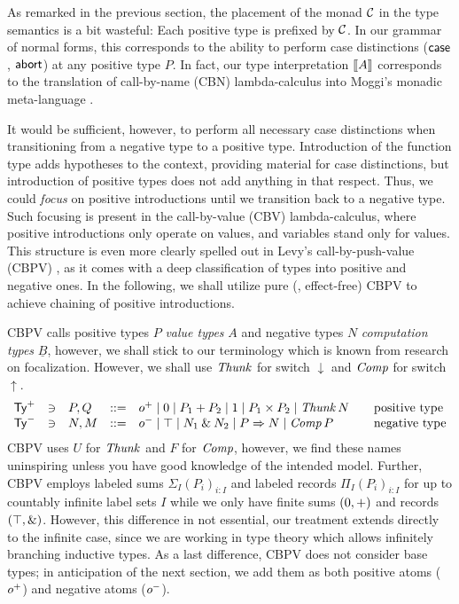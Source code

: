 \documentclass[a4paper,USenglish,cleveref, autoref]{lipics-v2019}
\begin{document}
As remarked in the previous section, the placement of the monad $\mathcal{C}$
in the type semantics is a bit wasteful:  Each positive type is
prefixed by $\mathcal{C}$.  In our grammar of normal forms, this corresponds to
the ability to perform case distinctions ($\mathsf{case}$, $\mathsf{abort}$) at any
positive type $P$.  In fact, our type interpretation $\mathopen{{[\kern-0.14em[}} A \mathclose{{]\kern-0.14em]}}$
corresponds to the translation of call-by-name (CBN) lambda-calculus
into Moggi's monadic meta-language \cite{moggi:infcomp91,levy:hosc05}.

It would be sufficient, however, to perform all necessary
case distinctions
when transitioning from a negative type to a positive type.
Introduction of the function type adds hypotheses to the context,
providing material for case distinctions, but introduction of positive
types does not add anything in that respect.  Thus, we could
\emph{focus} on positive introductions until we transition back to a
negative type.  Such focusing is present in the call-by-value (CBV)
lambda-calculus, where positive introductions only operate on values,
and variables stand only for values.  This structure is even more
clearly spelled out in Levy's call-by-push-value (CBPV)
\cite{levy:hosc05}, as it comes with a deep classification of types
into positive and negative ones.  In the following, we shall utilize
pure (\ie, effect-free) CBPV to achieve chaining of positive
introductions.

CBPV calls positive types $P$ \emph{value types} $A$ and negative
types $N$
\emph{computation types} $\underline B$,
however, we shall stick to our terminology
which is known from research on focalization.
However, we shall use $\mathit{Thunk}$ for switch $\downarrow$ and $\mathit{Comp}$ for
switch $\uparrow$.
\[
\begin{array}{lllrl@{\qquad}l}
  \PTy & \ni & P,Q & ::= & \patom
    \mid \tyzero \mid P_1 + P_2
    \mid \tyone \mid P_1 \times P_2
    \mid \Thunk N
  & \mbox{positive type}
\\
  \NTy & \ni & N,M & ::= & \natom
    \mid \top \mid N_1 \ntimes N_2
    \mid P \To N
    \mid \Comp P
  & \mbox{negative type}
\\
\end{array}
\]
CBPV uses $U$ for $\mathit{Thunk}$ and $F$ for $\mathit{Comp}$, however, we find
these names uninspiring unless you have good knowledge of the intended
model.  Further, CBPV employs labeled sums $\Sigma_I (P_i)_{i : I}$
and labeled records $\Pi_I (P_i)_{i : I}$ for up to countably infinite
label sets $I$ while we only have finite sums $(0,+)$ and
records $(\top,\mathbin{\&})$.  However, this difference in not essential,
our treatment extends directly to the infinite case, since we are
working in type theory which allows infinitely branching inductive
types.   As a last difference, CBPV does not consider base types; in
anticipation of the next section, we add them as both positive atoms
($o^+$) and negative atoms ($o^-$).
\end{document}
